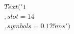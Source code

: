 \documentclass[preview]{standalone}
\begin{document}
\begin{align*}
Text('1\\,slot = 14\\, symbols = 0.125 ms')
\end{align*}
\end{document}
